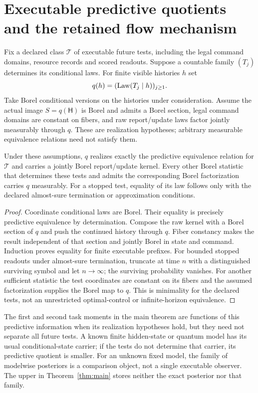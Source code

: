 \section{Executable predictive quotients and the retained flow mechanism}
\label{sec:quotient}
Fix a declared class $\mathcal T$ of executable future tests, including the legal command domains, resource records and scored readouts. Suppose a countable family $(T_j)$ determines its conditional laws. For finite visible histories $h$ set
\[
 q(h)=(\operatorname{Law}(T_j\mid h))_{j\ge1}.
\]
Take Borel conditional versions on the histories under consideration. Assume the actual image $S=q(\mathsf H)$ is Borel and admits a Borel section, legal command domains are constant on fibers, and raw report/update laws factor jointly measurably through $q$. These are realization hypotheses; arbitrary measurable equivalence relations need not satisfy them.

\begin{proposition}\label{prop:quotient}
Under these assumptions, $q$ realizes exactly the predictive equivalence relation for $\mathcal T$ and carries a jointly Borel report/update kernel. Every other Borel statistic that determines these tests and admits the corresponding Borel factorization carries $q$ measurably. For a stopped test, equality of its law follows only with the declared almost-sure termination or approximation conditions.
\end{proposition}
\begin{proof}
Coordinate conditional laws are Borel. Their equality is precisely predictive equivalence by determination. Compose the raw kernel with a Borel section of $q$ and push the continued history through $q$. Fiber constancy makes the result independent of that section and jointly Borel in state and command. Induction proves equality for finite executable prefixes. For bounded stopped readouts under almost-sure termination, truncate at time $n$ with a distinguished surviving symbol and let $n\to\infty$; the surviving probability vanishes. For another sufficient statistic the test coordinates are constant on its fibers and the assumed factorization supplies the Borel map to $q$. This is minimality for the declared tests, not an unrestricted optimal-control or infinite-horizon equivalence.
\end{proof}

The first and second task moments in the main theorem are functions of this predictive information when its realization hypotheses hold, but they need not separate all future tests. A known finite hidden-state or quantum model has its usual conditional-state carrier; if the tests do not determine that carrier, its predictive quotient is smaller. For an unknown fixed model, the family of modelwise posteriors is a comparison object, not a single executable observer. The upper in Theorem~\ref{thm:main} stores neither the exact posterior nor that family.

